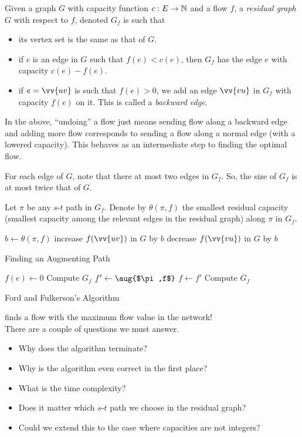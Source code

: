 \begin{definition}
	Given a graph $G$ with capacity function $c:E\to\mathbb{N}$ and a flow $f$, a \textit{residual graph} $G$ with respect to $f$, denoted $G_f$ is such that
	\begin{itemize}
		\item its vertex set is the same as that of $G$.
		\item if $e$ is an edge in $G$ such that $f(e)<c(e)$, then $G_f$ has the edge $e$ with capacity $c(e)-f(e)$.
		\item if $e=\vv{uv}$ is such that $f(e)>0$, we add an edge $\vv{vu}$ in $G_f$ with capacity $f(e)$ on it. This is called a \textit{backward edge}.
	\end{itemize}
\end{definition}

In the above, ``undoing'' a flow just means sending flow along a backward edge and adding more flow corresponds to sending a flow along a normal edge (with a lowered capacity). This behaves as an intermediate step to finding the optimal flow.

For each edge of $G$, note that there at most two edges in $G_f$. So, the size of $G_f$ is at most twice that of $G$.

Let $\pi$ be any $s$-$t$ path in $G_f$. Denote by $\theta(\pi,f)$ the smallest residual capacity (smallest capacity among the relevant edges in the residual graph) along $\pi$ in $G_f$.

\begin{algorithm}[H]
	\DontPrintSemicolon
	\SetNoFillComment
	 {
		$b\gets\theta(\pi,f)$\;
		 {
			 {
				increase $f(\vv{uv})$ in $G$ by $b$
			} {
				decrease $f(\vv{vu})$ in $G$ by $b$
			}
		}
	}
	\caption{Finding an Augmenting Path}\label{algo: aug path}
\end{algorithm}

\begin{algorithm}[H]
	\DontPrintSemicolon
	\SetNoFillComment
	 {
		$f(e)\gets 0$
	}
	Compute $G_f$\;
	 {
		$f'\gets\aug{$\pi,f$}$\;
		$f\gets f'$\;
		Compute $G_f$
	}
	\;
	\caption{Ford and Fulkerson's Algorithm}\label{algo: max flow}
\end{algorithm}

 finds a flow with the maximum flow value in the network!\\
There are a couple of questions we must answer.
\begin{itemize}
	\item Why does the algorithm terminate?
	\item Why is the algorithm even correct in the first place?
	\item What is the time complexity?
	\item Does it matter which $s$-$t$ path we choose in the residual graph?
	\item Could we extend this to the case where capacities are not integers?
\end{itemize}

